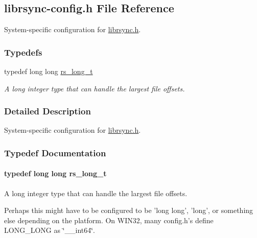 \hypertarget{librsync-config_8h}{
\subsection{librsync-config.h File Reference}
\label{librsync-config_8h}
}
System-specific configuration for \hyperlink{librsync_8h}{librsync.h}. 

\subsubsection*{Typedefs}
\begin{CompactItemize}
\item 
typedef long long \hyperlink{librsync-config_8h_6edddd44ca74c10ea65ef82d116e0ffa}{rs\_\-long\_\-t}
\begin{CompactList}\small\item\em A long integer type that can handle the largest file offsets. \item\end{CompactList}\end{CompactItemize}


\subsubsection{Detailed Description}
System-specific configuration for \hyperlink{librsync_8h}{librsync.h}. 



\subsubsection{Typedef Documentation}
\hypertarget{librsync-config_8h_6edddd44ca74c10ea65ef82d116e0ffa}{
\paragraph[rs\_\-long\_\-t]{\setlength{\rightskip}{0pt plus 5cm}typedef long long {\bf rs\_\-long\_\-t}}\hfill}
\label{librsync-config_8h_6edddd44ca74c10ea65ef82d116e0ffa}


A long integer type that can handle the largest file offsets. 

Perhaps this might have to be configured to be 'long long', 'long', or something else depending on the platform. On WIN32, many config.h's define LONG\_\-LONG as \char`\"{}\_\-\_\-int64\char`\"{}. 